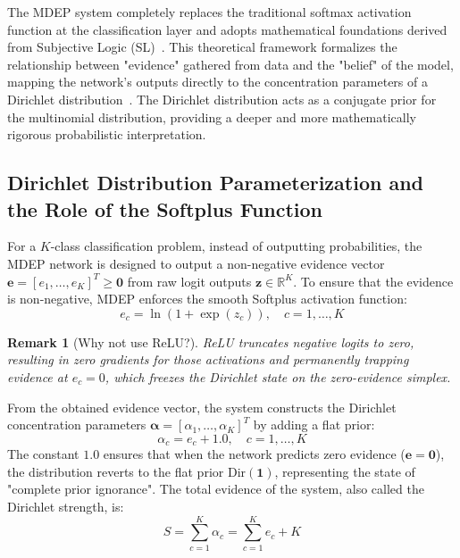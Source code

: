 \documentclass[letterpaper]{article} %
\newcommand{\Dir}{\text{Dir}}
\newcommand{\R}{\mathbb{R}}
\newtheorem{remark}{Remark}
\begin{document}
The MDEP system completely replaces the traditional softmax activation function at the classification layer and adopts mathematical foundations derived from Subjective Logic (SL)~\cite{josang2016subjective}. This theoretical framework formalizes the relationship between "evidence" gathered from data and the "belief" of the model, mapping the network's outputs directly to the concentration parameters of a Dirichlet distribution~\cite{sensoy2018evidential}. The Dirichlet distribution acts as a conjugate prior for the multinomial distribution, providing a deeper and more mathematically rigorous probabilistic interpretation.

\subsection{Dirichlet Distribution Parameterization and the Role of the Softplus Function}

For a $K$-class classification problem, instead of outputting probabilities, the MDEP network is designed to output a non-negative evidence vector $\bm{e} = [e_1, \ldots, e_K]^T \ge \bm{0}$ from raw logit outputs $\bm{z} \in \R^K$. To ensure that the evidence is non-negative, MDEP enforces the smooth Softplus activation function:
\begin{equation}\label{eq:softplus}
    e_c = \ln(1 + \exp(z_c)), \quad c = 1, \ldots, K
\end{equation}

\begin{remark}[Why not use ReLU?]
ReLU truncates negative logits to zero, resulting in zero gradients for those activations and permanently trapping evidence at $e_c = 0$, which freezes the Dirichlet state on the zero-evidence simplex.
\end{remark}

From the obtained evidence vector, the system constructs the Dirichlet concentration parameters $\bm{\alpha} = [\alpha_1, \ldots, \alpha_K]^T$ by adding a flat prior:
\begin{equation}\label{eq:alpha}
    \alpha_c = e_c + 1.0, \quad c = 1, \ldots, K
\end{equation}
The constant $1.0$ ensures that when the network predicts zero evidence ($\bm{e} = \bm{0}$), the distribution reverts to the flat prior $\Dir(\bm{1})$, representing the state of "complete prior ignorance". The total evidence of the system, also called the Dirichlet strength, is:
\begin{equation}\label{eq:S}
    S = \sum_{c=1}^K \alpha_c = \sum_{c=1}^K e_c + K
\end{equation}
\end{document}
